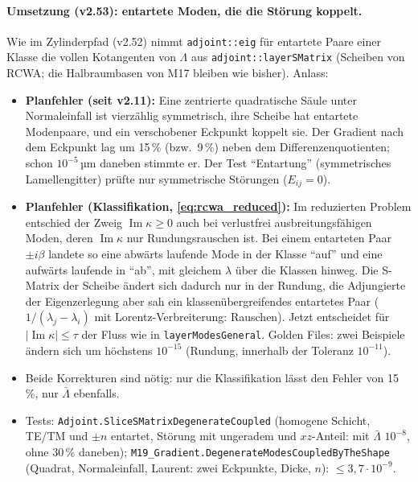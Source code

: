 \paragraph{Umsetzung (v2.53): entartete Moden, die die Störung koppelt.}
Wie im Zylinderpfad (v2.52) nimmt \verb|adjoint::eig| für entartete Paare einer Klasse die vollen Kotangenten von $\Lambda$
aus \verb|adjoint::layerSMatrix| (Scheiben von RCWA; die Halbraumbasen von M17 bleiben wie bisher). Anlass:
\begin{itemize}[nosep]
  \item \textbf{Planfehler (seit v2.11):} Eine zentrierte quadratische Säule unter Normaleinfall ist vierzählig symmetrisch,
        ihre Scheibe hat entartete Modenpaare, und ein verschobener Eckpunkt koppelt sie. Der Gradient nach dem Eckpunkt
        lag um 15\,\% (bzw.\ 9\,\%) neben dem Differenzenquotienten; schon $10^{-5}$\,µm daneben stimmte er. Der Test
        \enquote{Entartung} (symmetrisches Lamellengitter) prüfte nur symmetrische Störungen ($E_{ij}=0$).
  \item \textbf{Planfehler (Klassifikation, \eqref{eq:rcwa_reduced}):} Im reduzierten Problem entschied der Zweig
        $\operatorname{Im}\kappa\ge0$ auch bei verlustfrei ausbreitungsfähigen Moden, deren $\operatorname{Im}\kappa$ nur
        Rundungsrauschen ist. Bei einem entarteten Paar $\pm i\beta$ landete so eine abwärts laufende Mode in der Klasse
        \enquote{auf} und eine aufwärts laufende in \enquote{ab}, mit gleichem $\lambda$ über die Klassen hinweg. Die
        S-Matrix der Scheibe ändert sich dadurch nur in der Rundung, die Adjungierte der Eigenzerlegung aber sah ein
        klassenübergreifendes entartetes Paar ($1/(\lambda_j-\lambda_i)$ mit Lorentz-Verbreiterung: Rauschen). Jetzt entscheidet
        für $|\operatorname{Im}\kappa|\le\tau$ der Fluss wie in \verb|layerModesGeneral|. Golden Files: zwei Beispiele ändern
        sich um höchstens $10^{-15}$ (Rundung, innerhalb der Toleranz $10^{-11}$).
  \item Beide Korrekturen sind nötig: nur die Klassifikation lässt den Fehler von 15\,\%, nur $\bar\Lambda$ ebenfalls.
  \item Tests: \verb|Adjoint.SliceSMatrixDegenerateCoupled| (homogene Schicht, TE/TM und $\pm n$ entartet, Störung mit
        ungeradem und $xz$-Anteil: mit $\bar\Lambda$ $10^{-8}$, ohne $30\,\%$ daneben);
        \verb|M19_Gradient.DegenerateModesCoupledByTheShape| (Quadrat, Normaleinfall, Laurent: zwei Eckpunkte, Dicke, $n$):
        $\le3{,}7\cdot10^{-9}$.
\end{itemize}

